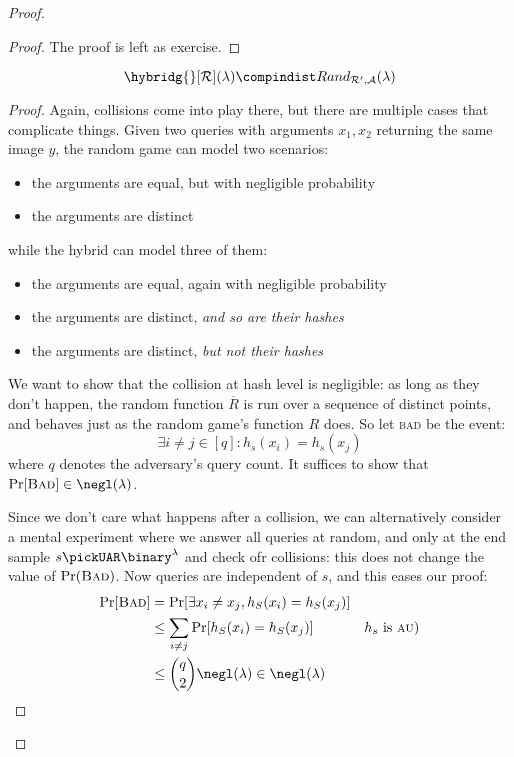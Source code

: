 \begin{proof}
    \begin{proof}
        The proof is left as exercise.
    \end{proof}

    \begin{lemma}
        \[
            \hybridg{}[\R](\lambda) \compindist Rand_{\R', \A}(\lambda)
        \]
    \end{lemma}

    \begin{proof}

        Again, collisions come into play there, but there are multiple cases that complicate things. Given two queries with arguments $x_1, x_2$ returning the same image $y$, the random game can model two scenarios:

        \begin{itemize}
            \item the arguments are equal, but with negligible probability
            \item the arguments are distinct
        \end{itemize}

        while the hybrid can model three of them:

        \begin{itemize}
            \item the arguments are equal, again with negligible probability
            \item the arguments are distinct, \emph{and so are their hashes}
            \item the arguments are distinct, \emph{but not their hashes}
        \end{itemize}
    
        We want to show that the collision at hash level is negligible: as long as they don't happen, the random function $\overline{R}$ is run over a sequence of distinct points, and behaves just as the random game's function $R$ does. So let \textsc{bad} be the event:
        \[
            \exists i \neq j \in [q] : h_s(x_i) = h_s(x_j)
        \]
        where $q$ denotes the adversary's query count. It suffices to show that $\Pr[\textsc{Bad}] \in \negl(\lambda)$.

        Since we don't care what happens after a collision, we can alternatively consider a mental experiment where we answer all queries at random, and only at the end sample $s \pickUAR \binary^\lambda$ and check ofr collisions: this does not change the value of $\Pr(\textsc{Bad})$. Now queries are independent of $s$, and this eases our proof:
        \begin{align*}
            \Pr[\textsc{Bad}] &= \Pr[\exists x_i \neq x_j, h_S(x_i) = h_S(x_j)] &                               \\
            &\leq \sum_{i \neq j} \Pr[h_S(x_i) = h_S(x_j)]                      & \text{$h_s$ is \textsc{au})}  \\
            &\leq \binom{q}{2} \negl(\lambda) \in \negl(\lambda)                &
        \end{align*}


\end{proof}
\end{proof}
